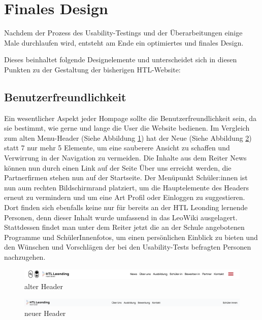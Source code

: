 \section{Finales Design}
Nachdem der Prozess des Usability-Testings und der Überarbeitungen einige Male durchlaufen
wird, entsteht am Ende ein optimiertes und finales Design. 

Dieses beinhaltet folgende Designelemente und unterscheidet sich in diesen Punkten zu der Gestaltung der bisherigen HTL-Website:


\subsection{Benutzerfreundlichkeit}
Ein wesentlicher Aspekt jeder Hompage sollte die Benutzerfreundlichkeit sein, da sie bestimmt, wie gerne und lange die User die Website bedienen.   
Im Vergleich zum alten Menu-Header (Siehe Abbildung \ref{fig:impl:header:alt}) hat der Neue (Siehe Abbildung \ref{fig:impl:header:neu}) statt 7 nur mehr 5 Elemente, um eine sauberere
   Ansicht zu schaffen und Verwirrung in der Navigation zu vermeiden. Die Inhalte aus dem Reiter \glqq News\grqq{} können nun durch einen Link auf der Seite
   \glqq Über uns\glqq{} erreicht werden, die Partnerfirmen stehen nun auf der Startseite. Der Menüpunkt \glqq Schüler:innen\grqq{} ist nun
   aum rechten Bildschirmrand platziert, um die Hauptelemente des Headers erneut zu vermindern und um eine Art \glqq Profil\grqq{}
   oder \glqq Einloggen\glqq{} zu suggestieren. Dort finden sich ebenfalls keine nur für bereits an der HTL Leonding
   lernende Personen, denn dieser Inhalt wurde umfassend in das LeoWiki ausgelagert. Stattdessen findet man unter 
   dem Reiter jetzt die an der Schule angebotenen Programme und SchülerInnenfotos, um einen persönlichen Einblick zu bieten und 
   den Wünschen und Vorschlägen der bei den Usability-Tests befragten Personen nachzugehen.

\begin{figure}
      \centering
      \includegraphics[scale=0.3]{pics/header_alt.png}
      \caption{alter Header}
      \label{fig:impl:header:alt}
  \end{figure}

  \begin{figure}
   \centering
   \includegraphics[scale=0.3]{pics/header_neu.png}
   \caption{neuer Header}
   \label{fig:impl:header:neu}
\end{figure}


